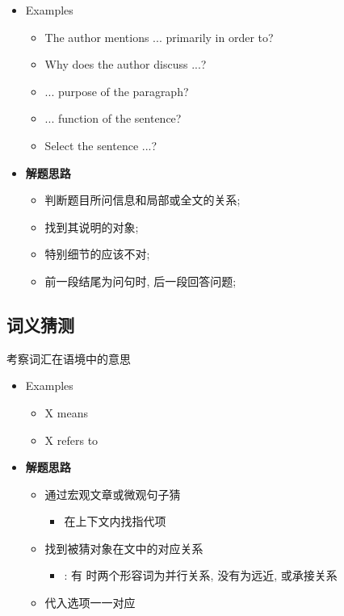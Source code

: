     \begin{itemize}
      \item Examples
      \begin{itemize}
        \item The author mentions ... primarily in order to?
        \item Why does the author discuss ...?
        \item ... purpose of the paragraph?
        \item ... function of the sentence?
        \item Select the sentence ...?
      \end{itemize}

      \item \textbf{解题思路}
      \begin{itemize}
        \item 判断题目所问信息和局部或全文的关系;
        \item 找到其说明的对象;
        \item 特别细节的应该不对;
        \item 前一段结尾为问句时, 后一段回答问题;
      \end{itemize}
    \end{itemize}

  \subsection{词义猜测}

    考察词汇在语境中的意思

    \begin{itemize}
      \item Examples
      \begin{itemize}
        \item X means
        \item X refers to
      \end{itemize}

      \item \textbf{解题思路}
      \begin{itemize}
        \item 通过宏观文章或微观句子猜
        \begin{itemize}
          \item 在上下文内找指代项
        \end{itemize}

        \item 找到被猜对象在文中的对应关系
        \begin{itemize}
          \item {}: 有 \say{,} 时两个形容词为并行关系,
          没有为远近, 或承接关系
        \end{itemize}

        \item 代入选项一一对应
      \end{itemize}
    \end{itemize}

